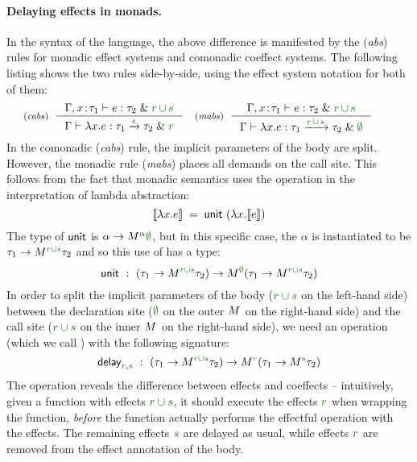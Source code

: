 \paragraph{Delaying effects in monads.}
In the syntax of the language, the above difference is manifested by the (\emph{abs}) rules for
monadic effect systems and comonadic coeffect systems. The following listing shows the two rules
side-by-side, using the effect system notation for both of them:
%
\begin{equation*}
\tyrule{cabs}
  { \Gamma, x\!:\!\tau_1 \vdash e : \tau_2 \;\&\; \cclrd{r}\,\cclrd{\cup}\,\cclrd{s} }
  { \Gamma \vdash \lambda x.e : \tau_1 \xrightarrow{\cclrd{s}} \tau_2 \;\&\; \cclrd{r}}
\quad
\tyrule{mabs}
  { \Gamma, x\!:\!\tau_1 \vdash e : \tau_2 \;\&\; \cclrd{r}\,\cclrd{\cup}\,\cclrd{s}}
  { \Gamma \vdash \lambda x.e : \tau_1 \xrightarrow{\cclrd{r}\,\cclrd{\cup}\,\cclrd{s}} \tau_2 \;\&\; \cclrd{\emptyset} }
\qquad
\end{equation*}
%
In the comonadic (\emph{cabs}) rule, the implicit parameters of the body are split. However,
the monadic rule (\emph{mabs}) places all demands on the call site. This follows from the
fact that monadic semantics uses the  operation in the interpretation of lambda abstraction:
%
\begin{equation*}
\sem{\lambda x.e} \;=\; \ident{unit}~(\lambda x. \sem{e})
\end{equation*}
%
The type of $\textnormal{\sffamily unit}$ is $\alpha\rightarrow\mtyp{\alpha}{\cclrd{\emptyset}}$, but in this specific
case, the $\alpha$ is instantiated to be $\tau_1\rightarrow\mtyp{\cclrd{r \cup s}}{\tau_2}$ and so this
use of  has a type:
%
\begin{equation*}
\ident{unit}~:~(\tau_1\rightarrow\mtyp{\cclrd{r \cup s}}{\tau_2}) \rightarrow \mtyp{\cclrd{\emptyset}}(\tau_1\rightarrow\mtyp{\cclrd{r \cup s}}{\tau_2})
\end{equation*}
%
In order to split the implicit parameters of the body ($\cclrd{r \cup s}$ on the left-hand side) between
the declaration site ($\cclrd{\emptyset}$ on the outer $\mtyp{}$ on the right-hand side) and the
call site ($\cclrd{r \cup s}$ on the inner $\mtyp{}$ on the right-hand side), we need an operation
(which we call ) with the following signature:
%
\begin{equation*}
\ident{delay}_{\cclrd{r}, \cclrd{s}}~:~(\tau_1\rightarrow\mtyp{\cclrd{r \cup s}}{\tau_2}) \rightarrow \mtyp{\cclrd{r}}(\tau_1\rightarrow\mtyp{\cclrd{s}}{\tau_2})
\end{equation*}
%
The operation reveals the difference between effects and coeffects -- intuitively, given a function
with effects $\cclrd{r \cup s}$, it should execute the effects $\cclrd{r}$ when wrapping the
function, \emph{before} the function actually performs the effectful operation with the effects.
The remaining effects $\cclrd{s}$ are delayed as usual, while effects $\cclrd{r}$ are removed
from the effect annotation of the body.

